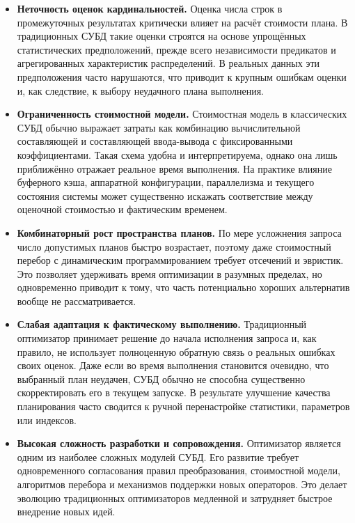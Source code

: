 \begin{itemize}
    \item \textbf{Неточность оценок кардинальностей.} \cite{10.14778/2850583.2850594, 10.1007/s00778-017-0480-7, 10.5555/645923.673638} Оценка числа строк в промежуточных результатах критически влияет на расчёт стоимости плана. В традиционных СУБД такие оценки строятся на основе упрощённых статистических предположений, прежде всего независимости предикатов и агрегированных характеристик распределений. В реальных данных эти предположения часто нарушаются, что приводит к крупным ошибкам оценки и, как следствие, к выбору неудачного плана выполнения.

    \item \textbf{Ограниченность стоимостной модели.} \cite{10.5555/645925.671662, 10.1145/1376616.1376713, 10.1109/ICDE.2013.6544899} Стоимостная модель в классических СУБД обычно выражает затраты как комбинацию вычислительной составляющей и составляющей ввода-вывода с фиксированными коэффициентами. Такая схема удобна и интерпретируема, однако она лишь приближённо отражает реальное время выполнения. На практике влияние буферного кэша, аппаратной конфигурации, параллелизма и текущего состояния системы может существенно искажать соответствие между оценочной стоимостью и фактическим временем.

    \item \textbf{Комбинаторный рост пространства планов.} \cite{10.1007/s007780050040, 10.1145/93605.98740} По мере усложнения запроса число допустимых планов быстро возрастает, поэтому даже стоимостный перебор с динамическим программированием требует отсечений и эвристик. Это позволяет удерживать время оптимизации в разумных пределах, но одновременно приводит к тому, что часть потенциально хороших альтернатив вообще не рассматривается.

    \item \textbf{Слабая адаптация к фактическому выполнению.} \cite{10.1145/276305.276315} Традиционный оптимизатор принимает решение до начала исполнения запроса и, как правило, не использует полноценную обратную связь о реальных ошибках своих оценок. Даже если во время выполнения становится очевидно, что выбранный план неудачен, СУБД обычно не способна существенно скорректировать его в текущем запуске. В результате улучшение качества планирования часто сводится к ручной перенастройке статистики, параметров или индексов.

    \item \textbf{Высокая сложность разработки и сопровождения.} \cite{10.1145/275487.275492} Оптимизатор является одним из наиболее сложных модулей СУБД. Его развитие требует одновременного согласования правил преобразования, стоимостной модели, алгоритмов перебора и механизмов поддержки новых операторов. Это делает эволюцию традиционных оптимизаторов медленной и затрудняет быстрое внедрение новых идей.
\end{itemize}

